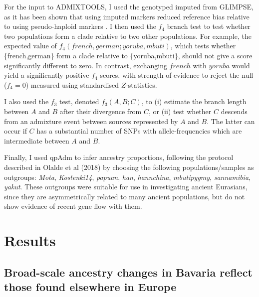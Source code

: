 For the input to ADMIXTOOLS, I used the genotyped imputed from GLIMPSE, as it has been shown that using imputed markers reduced reference bias relative to using pseudo-haploid markers \cite{Martiniano2017}. I then used the $f_{4}$ branch test to test whether two populations form a clade relative to two other populations. For example, the expected value of $f_{4}(french,german;yoruba,mbuti)$, which tests whether \{french,german\} form a clade relative to \{yoruba,mbuti\}, should not give a score significantly different to zero. In contrast, exchanging $french$ with $yoruba$ would yield a significantly positive $f_4$ scores, with strength of evidence to reject the null ($f_4 = 0$) measured using standardised $Z$-statistics.

I also used the $f_3$ test, denoted $f_{3}(A,B;C)$, to (i) estimate the branch length between $A$ and $B$ after their divergence from $C$, or (ii) test whether $C$ descends from an admixture event between sources represented by $A$ and $B$. The latter can occur if $C$ has a substantial number of SNPs with allele-frequencies which are intermediate between $A$ and $B$.

Finally, I used qpAdm to infer ancestry proportions, following the protocol described in Olalde et al (2018) by choosing the following populations/samples as outgroups: \textit{Mota}, \textit{Kostenki14}, \textit{papuan}, \textit{han}, \textit{hannchina}, \textit{mbutipygmy}, \textit{sannamibia}, \textit{yakut}. These outgroups were suitable for use in investigating ancient Eurasians, since they are asymmetrically related to many ancient populations, but do not show evidence of recent gene flow with them. 

\section{Results}

\subsection{Broad-scale ancestry changes in Bavaria reflect those found elsewhere in Europe}

